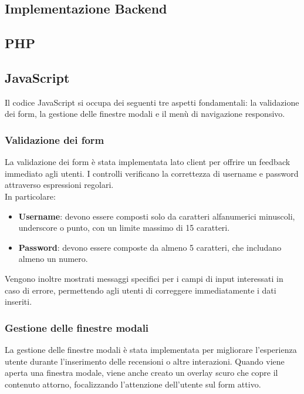 \documentclass[a4paper, 12pt]{article}
\begin{document}
\begin{justify}
\section{Implementazione Backend}

\subsection{PHP}

\subsection{JavaScript}

Il codice JavaScript si occupa dei seguenti tre aspetti fondamentali: la validazione dei form, la gestione delle finestre modali e il menù di navigazione responsivo.

\subsubsection{Validazione dei form}

La validazione dei form è stata implementata lato client per offrire un feedback immediato agli utenti. I controlli verificano la correttezza di username e password attraverso espressioni regolari.\\
In particolare:
\begin{itemize}
    \item \textbf{Username}: devono essere composti solo da caratteri alfanumerici minuscoli, underscore o punto, con un limite massimo di 15 caratteri.
    \item \textbf{Password}: devono essere composte da almeno 5 caratteri, che includano almeno un numero.
\end{itemize}
Vengono inoltre mostrati messaggi specifici per i campi di input interessati in  caso di errore, permettendo agli utenti di correggere immediatamente i dati inseriti.

\subsubsection{Gestione delle finestre modali}

La gestione delle finestre modali è stata implementata per migliorare l'esperienza utente durante l'inserimento delle recensioni o altre interazioni. Quando viene aperta una finestra modale, viene anche creato un overlay scuro che copre il contenuto attorno, focalizzando l'attenzione dell'utente sul form attivo.


\end{justify}
\end{document}
